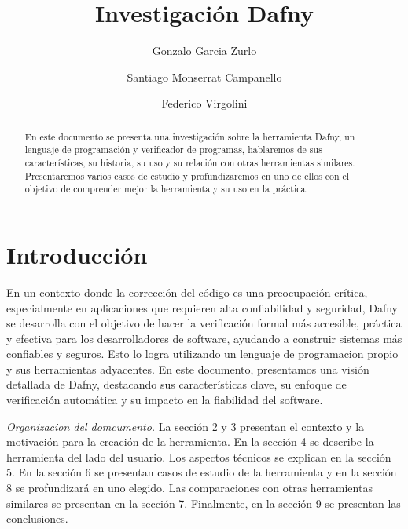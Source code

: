 \documentclass[runningheads]{llncs}
\begin{document}
%
\title{Investigación Dafny}
%
\author{Gonzalo Garcia Zurlo \and
Santiago Monserrat Campanello \and
Federico Virgolini}
%
%
%
\maketitle
\begin{abstract}
En este documento se presenta una investigación sobre la herramienta Dafny, un lenguaje de programación y verificador de programas,
hablaremos de sus características, su historia, su uso y su relación con otras herramientas similares. 
Presentaremos varios casos de estudio y profundizaremos en uno de ellos con el objetivo de comprender mejor la herramienta y su uso en la práctica.
\end{abstract}

\section{Introducción}

En un contexto donde la corrección del código es una preocupación crítica, especialmente en aplicaciones que requieren alta confiabilidad y seguridad,
Dafny se desarrolla con el objetivo de hacer la verificación formal más accesible, práctica y efectiva para los desarrolladores de software, 
ayudando a construir sistemas más confiables y seguros.
Esto lo logra utilizando un lenguaje de programacion propio y sus herramientas adyacentes.
En este documento, presentamos una visión detallada de Dafny, 
destacando sus características clave, su enfoque de verificación automática y su impacto en la fiabilidad del software.

\emph{Organizacion del domcumento.} La sección 2 y 3 presentan el contexto y la motivación para la creación de la herramienta.
En la sección 4 se describe la herramienta del lado del usuario. Los aspectos técnicos se explican en la sección 5.
En la sección 6 se presentan casos de estudio de la herramienta y en la sección 8 se profundizará en uno elegido. 
Las comparaciones con otras herramientas similares se presentan en la sección 7. Finalmente, en la sección 9 se presentan las conclusiones.
\end{document}
